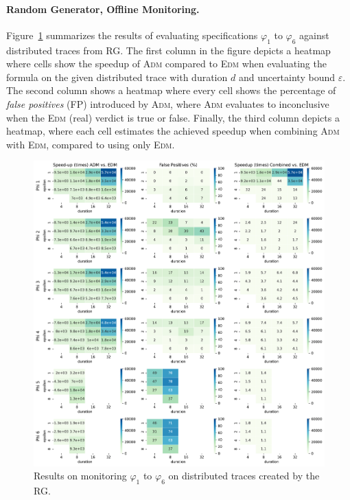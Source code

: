 \paragraph*{Random Generator, Offline Monitoring.}
Figure~\ref{fig:rgresults} summarizes the results of evaluating specifications $\varphi_1$ to $\varphi_6$ against distributed traces from RG.
The first column in the figure depicts a heatmap where cells show the speedup of \textsc{Adm} compared to \textsc{Edm} when evaluating the formula on the given distributed trace with duration $d$ and uncertainty bound $\varepsilon$.
The second column shows a heatmap where every cell shows the percentage of \emph{false positives} (FP) introduced by \textsc{Adm}, where \textsc{Adm} evaluates to inconclusive when the \textsc{Edm} (real) verdict is true or false.
Finally, the third column depicts a heatmap, where each cell estimates the achieved speedup when combining \textsc{Adm} with \textsc{Edm}, compared to using only \textsc{Edm}.

\begin{figure}[t]
	\begin{center}
	\includegraphics[width=\linewidth]{speedup_all}
\caption{Results on monitoring $\varphi_{1}$ to $\varphi_{6}$ on distributed traces created by the RG.}
\label{fig:rgresults}
\end{center}
\end{figure}

